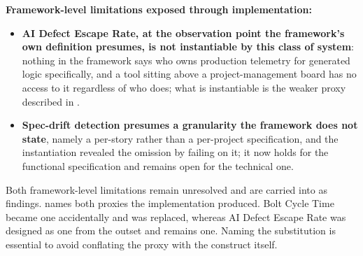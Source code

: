 \noindent\textbf{Framework-level limitations exposed through implementation:}

\begin{itemize}[leftmargin=0.6cm, itemsep=0.4em]

\item \textbf{AI Defect Escape Rate, at the observation point the framework's own definition presumes, is not instantiable by this class of system}: nothing in the framework says who owns production telemetry for generated logic specifically, and a tool sitting above a project-management board has no access to it regardless of who does; what is instantiable is the weaker proxy described in .

\item \textbf{Spec-drift detection presumes a granularity the framework does not state}, namely a per-story rather than a per-project specification, and the instantiation revealed the omission by failing on it; it now holds for the functional specification and remains open for the technical one.

\end{itemize}

Both framework-level limitations remain unresolved and are carried into  as findings.  names both proxies the implementation produced. Bolt Cycle Time became one accidentally and was replaced, whereas AI Defect Escape Rate was designed as one from the outset and remains one. Naming the substitution is essential to avoid conflating the proxy with the construct itself.